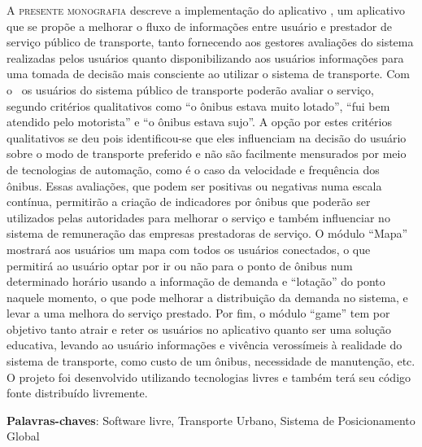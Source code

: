 \lettrine{A}{ presente monografia} descreve a implementação do aplicativo \trilhasp, um aplicativo que se propõe a melhorar o fluxo de informações entre usuário e prestador de serviço público de transporte, tanto fornecendo aos gestores avaliações do sistema realizadas pelos usuários quanto disponibilizando aos usuários informações para uma tomada de decisão mais consciente ao utilizar o sistema de transporte.
Com o \trilhasp~os usuários do sistema público de transporte poderão avaliar o serviço, segundo critérios qualitativos como ``o ônibus estava muito lotado'', ``fui bem atendido pelo motorista'' e ``o ônibus estava sujo''. A opção por estes critérios qualitativos se deu pois identificou-se que eles influenciam na decisão do usuário sobre o modo de transporte preferido e não são facilmente mensurados por meio de tecnologias de automação, como é o caso da velocidade e frequência dos ônibus. Essas avaliações, que podem ser positivas ou negativas numa escala contínua, permitirão a criação de indicadores por ônibus que poderão ser utilizados pelas autoridades para melhorar o serviço e também influenciar no sistema de remuneração das empresas prestadoras de serviço.
O módulo ``Mapa'' mostrará aos usuários um mapa com todos os usuários conectados, o que permitirá ao usuário optar por ir ou não para o ponto de ônibus num determinado horário usando a informação de demanda e ``lotação'' do ponto naquele momento, o que pode melhorar a distribuição da demanda no sistema, e levar a uma melhora do serviço prestado.
Por fim, o módulo ``game'' tem por objetivo tanto atrair e reter os usuários no aplicativo quanto ser uma solução educativa, levando ao usuário informações e vivência verossímeis à realidade do sistema de transporte, como custo de um ônibus, necessidade de manutenção, etc.
O projeto foi desenvolvido utilizando tecnologias livres e também terá seu código fonte distribuído livremente.

\vspace{\onelineskip}

\vfill

\noindent

\textbf{Palavras-chaves}: Software livre, Transporte Urbano, Sistema de Posicionamento Global